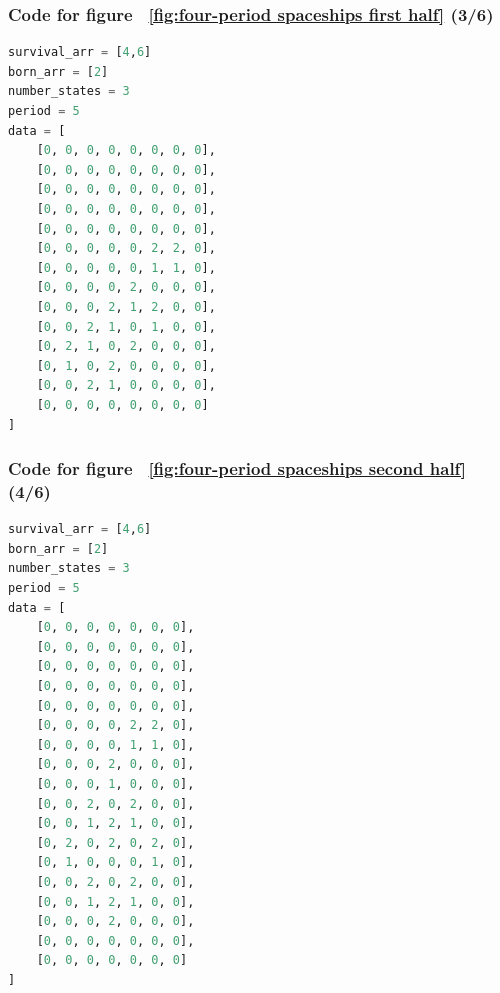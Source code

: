 \documentclass[12pt]{article}
\numberwithin{figure}{section} %
\begin{document}
\noindent\begin{minipage}{.50\textwidth}
\subsubsection{Code for figure ~\ref{fig:four-period spaceships first half} (3/6)}
\label{subsubsection:four-period spaceships(3/6)}
\begin{lstlisting}[language = Python]
survival_arr = [4,6]
born_arr = [2]
number_states = 3
period = 5
data = [
    [0, 0, 0, 0, 0, 0, 0, 0],
    [0, 0, 0, 0, 0, 0, 0, 0],
    [0, 0, 0, 0, 0, 0, 0, 0],
    [0, 0, 0, 0, 0, 0, 0, 0],
    [0, 0, 0, 0, 0, 0, 0, 0],
    [0, 0, 0, 0, 0, 2, 2, 0],
    [0, 0, 0, 0, 0, 1, 1, 0],
    [0, 0, 0, 0, 2, 0, 0, 0],
    [0, 0, 0, 2, 1, 2, 0, 0],
    [0, 0, 2, 1, 0, 1, 0, 0],
    [0, 2, 1, 0, 2, 0, 0, 0],
    [0, 1, 0, 2, 0, 0, 0, 0],
    [0, 0, 2, 1, 0, 0, 0, 0],
    [0, 0, 0, 0, 0, 0, 0, 0]
]
\end{lstlisting}
\end{minipage}\hfill
\begin{minipage}{.45\textwidth}
\subsubsection{Code for figure ~\ref{fig:four-period spaceships second half} (4/6)}
\label{subsubsection:four-period spaceships(4/6)}
\begin{lstlisting}[language = Python]
survival_arr = [4,6]
born_arr = [2]
number_states = 3
period = 5
data = [
    [0, 0, 0, 0, 0, 0, 0],
    [0, 0, 0, 0, 0, 0, 0],
    [0, 0, 0, 0, 0, 0, 0],
    [0, 0, 0, 0, 0, 0, 0],
    [0, 0, 0, 0, 0, 0, 0],
    [0, 0, 0, 0, 2, 2, 0],
    [0, 0, 0, 0, 1, 1, 0],
    [0, 0, 0, 2, 0, 0, 0],
    [0, 0, 0, 1, 0, 0, 0],
    [0, 0, 2, 0, 2, 0, 0],
    [0, 0, 1, 2, 1, 0, 0],
    [0, 2, 0, 2, 0, 2, 0],
    [0, 1, 0, 0, 0, 1, 0],
    [0, 0, 2, 0, 2, 0, 0],
    [0, 0, 1, 2, 1, 0, 0],
    [0, 0, 0, 2, 0, 0, 0],
    [0, 0, 0, 0, 0, 0, 0],
    [0, 0, 0, 0, 0, 0, 0]
]
\end{lstlisting}
\end{minipage}
\end{document}
